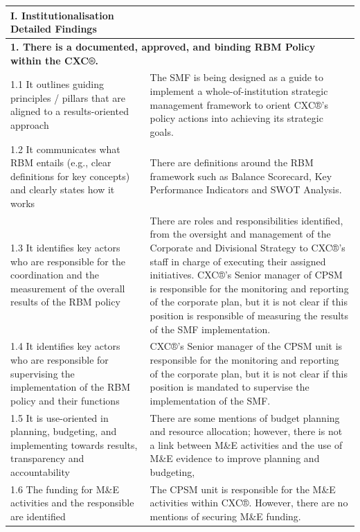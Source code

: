 \documentclass[
  10pt,
]{book}
\begin{document}
\begin{table}
\centering
\begin{tabular}[t]{l|l}
\hline
I. Institutionalisation Detailed Findings &  \\
\hline
\multicolumn{2}{l}{\textbf{1. There is a documented, approved, and binding RBM Policy within the CXC®.}}\\
\hline
\hspace{1em}1.1 It outlines guiding principles / pillars that are aligned to a results-oriented approach & The SMF is being designed as a guide to implement a whole-of-institution strategic management framework to orient CXC®’s policy actions into achieving its strategic goals.\\
\hline
\hspace{1em}1.2 It communicates what RBM entails (e.g., clear definitions for key concepts) and clearly states how it works & There are definitions around the RBM framework such as Balance Scorecard, Key Performance Indicators and SWOT Analysis.\\
\hline
\hspace{1em}1.3 It identifies key actors who are responsible for the coordination and the measurement of the overall results of the RBM policy & There are roles and responsibilities identified, from the oversight and management of the Corporate and Divisional Strategy to CXC®’s staff in charge of executing their assigned initiatives. CXC®’s Senior manager of CPSM is responsible for the monitoring and reporting of the corporate plan, but it is not clear if this position is responsible of measuring the results of the SMF implementation.\\
\hline
\hspace{1em}1.4 It identifies key actors who are responsible for supervising the implementation of the RBM policy and their functions & CXC®’s Senior manager of the CPSM unit is responsible for the monitoring and reporting of the corporate plan, but it is not clear if this position is mandated to supervise the implementation of the SMF.\\
\hline
\hspace{1em}1.5 It is use-oriented in planning, budgeting, and implementing towards results, transparency and accountability & There are some mentions of budget planning and resource allocation; however, there is not a link between M\&E activities and the use of M\&E evidence to improve planning and budgeting,\\
\hline
\hspace{1em}1.6 The funding for M\&E activities and the responsible are identified & The CPSM unit is responsible for the M\&E activities within CXC®. However, there are no mentions of securing M\&E funding.\\

\end{tabular}
\end{table}
\end{document}
